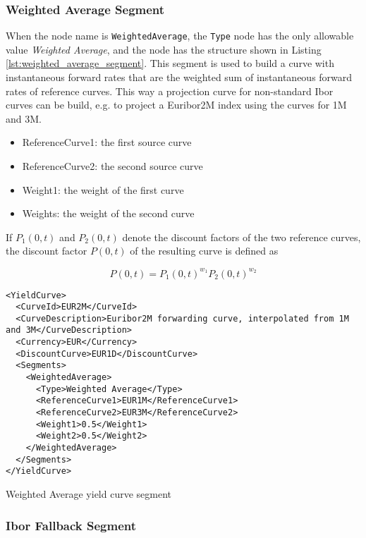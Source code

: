 \subsubsection*{Weighted Average Segment}
\label{sec:weigthed_average}

When the node name is \lstinline!WeightedAverage!, the \lstinline!Type! node has the only allowable value
\emph{Weighted Average}, and the node has the structure shown in Listing \ref{lst:weighted_average_segment}. This segment
is used to build a curve with instantaneous forward rates that are the weighted sum of instantaneous forward rates of
reference curves. This way a projection curve for non-standard Ibor curves can be build, e.g. to project a Euribor2M
index using the curves for 1M and 3M.

\begin{itemize}
\item ReferenceCurve1: the first source curve
\item ReferenceCurve2: the second source curve
\item Weight1: the weight of the first curve
\item Weights: the weight of the second curve
\end{itemize}

If $P_1(0,t)$ and $P_2(0,t)$ denote the discount factors of the two reference curves, the discount factor $P(0,t)$ of
the resulting curve is defined as

\begin{equation}
P(0,t) = P_1(0,t)^{w_1}P_2(0,t)^{w_2}
\end{equation}

\begin{listing}[H]
\begin{verbatim}
<YieldCurve>
  <CurveId>EUR2M</CurveId>
  <CurveDescription>Euribor2M forwarding curve, interpolated from 1M and 3M</CurveDescription>
  <Currency>EUR</Currency>
  <DiscountCurve>EUR1D</DiscountCurve>
  <Segments>
    <WeightedAverage>
      <Type>Weighted Average</Type>
      <ReferenceCurve1>EUR1M</ReferenceCurve1>
      <ReferenceCurve2>EUR3M</ReferenceCurve2>
      <Weight1>0.5</Weight1>
      <Weight2>0.5</Weight2>
    </WeightedAverage>
  </Segments>
</YieldCurve>
\end{verbatim}
\caption{Weighted Average yield curve segment}
\label{lst:weighted_average_segment}
\end{listing}

\subsubsection*{Ibor Fallback Segment}
\label{sec:ibor_fallback_curve_segment}

